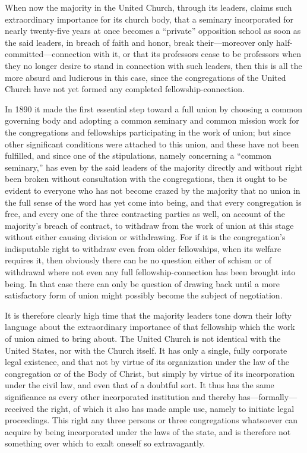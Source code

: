 When now the majority in the United Church, through its leaders, claims such extraordinary importance for its church body, that a seminary incorporated for nearly twenty-five years at once becomes a “private” opposition school as soon as the said leaders, in breach of faith and honor, break their—moreover only half-committed—connection with it, or that its professors cease to be professors when they no longer desire to stand in connection with such leaders, then this is all the more absurd and ludicrous in this case, since the congregations of the United Church have not yet formed any completed fellowship-connection.

In 1890 it made the first essential step toward a full union by choosing a common governing body and adopting a common seminary and common mission work for the congregations and fellowships participating in the work of union; but since other significant conditions were attached to this union, and these have not been fulfilled, and since one of the stipulations, namely concerning a “common seminary,” has even by the said leaders of the majority directly and without right been broken without consultation with the congregations, then it ought to be evident to everyone who has not become crazed by the majority that no union in the full sense of the word has yet come into being, and that every congregation is free, and every one of the three contracting parties as well, on account of the majority’s breach of contract, to withdraw from the work of union at this stage without either causing division or withdrawing. For if it is the congregation’s indisputable right to withdraw even from older fellowships, when its welfare requires it, then obviously there can be no question either of schism or of withdrawal where not even any full fellowship-connection has been brought into being. In that case there can only be question of drawing back until a more satisfactory form of union might possibly become the subject of negotiation.

It is therefore clearly high time that the majority leaders tone down their lofty language about the extraordinary importance of that fellowship which the work of union aimed to bring about. The United Church is not identical with the United States, nor with the Church itself. It has only a single, fully corporate legal existence, and that not by virtue of its organization under the law of the congregation or of the Body of Christ, but simply by virtue of its incorporation under the civil law, and even that of a doubtful sort. It thus has the same significance as every other incorporated institution and thereby has—formally—received the right, of which it also has made ample use, namely to initiate legal proceedings. This right any three persons or three congregations whatsoever can acquire by being incorporated under the laws of the state, and is therefore not something over which to exalt oneself so extravagantly.


